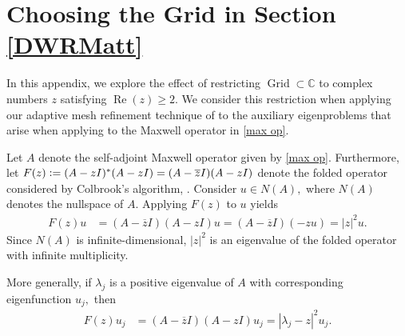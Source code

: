 \chapter{Choosing the Grid in Section \ref{DWRMatt}}\label{AppendMax}

In this appendix, we explore the effect of restricting $\operatorname{Grid} \subset \mathbb{C}$ to complex numbers $z$ satisfying $\operatorname{Re}(z) \ge 2.$ We consider this restriction when applying our adaptive mesh refinement technique of  to the auxiliary eigenproblems that arise when applying  to the Maxwell operator in \eqref{max op}. 


Let $A$ denote the self-adjoint Maxwell operator given by \eqref{max op}. Furthermore, let $F(z) \vcentcolon= (A-zI)^*(A-zI) = (A-\overline{z}I)(A-zI)$ denote the folded operator considered by Colbrook's algorithm, . Consider $u \in N(A),$ where $N(A)$ denotes the nullspace of $A.$ Applying $F(z)$ to $u$ yields 
\begin{align}
    F(z) u &= (A-\overline{z}I)(A-zI) u = (A-\overline{z}I)(-zu) = |z|^2 u.
\end{align}
Since $N(A)$ is infinite-dimensional, $|z|^2$ is an eigenvalue of the folded operator with infinite multiplicity. 

More generally, if $\lambda_j$ is a positive eigenvalue of $A$ with corresponding eigenfunction $u_j,$ then
\begin{align}
    F(z) u_j &= (A-\overline{z}I)(A-zI) u_j = |\lambda_j - z|^2 u_j.
\end{align}


